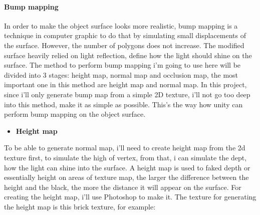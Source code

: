 \documentclass[a4paper, 13pt]{extarticle}
\begin{document}
	\paragraph{Bump mapping}
	In order to make the object surface looks more realistic, bump mapping is a technique in computer graphic to do that by simulating small displacements of the surface. However, the number of polygons does not increase. The modified surface heavily relied on light reflection, define how the light should shine on the surface.
	The method to perform bump mapping i'm going to use here will be divided into 3 stages: height map, normal map and occlusion map, the most important one in this method are height map and normal map. In this project, since i'll only generate bump map from a simple 2D texture, i'll not go too deep into this method, make it as simple as possible. This's the way how unity can perform bump mapping on the object surface.
	\begin{itemize}
		\item \bfseries Height map	 	
	\end{itemize}
		To be able to generate normal map, i'll need to create height map from the 2d texture first, to simulate the high of vertex, from that, i can simulate the dept, how the light can shine into the surface. A height map is used to faked depth or essentially height on areas of texture map, the larger the difference between the height and the black, the more the distance it will appear on the surface. For creating the height map, i'll use Photoshop to make it. The texture for generating  the height map is this brick texture, for example: 
\end{document}
